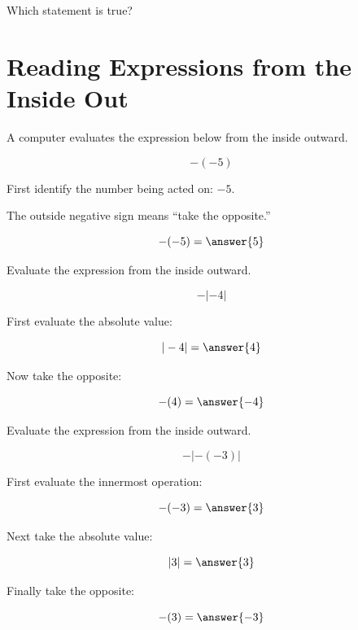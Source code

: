 \documentclass{ximera}[font=12pt]
\begin{document}
\begin{problem}
Which statement is true?

\begin{multipleChoice}
\end{multipleChoice}

\end{problem}


\section*{Reading Expressions from the Inside Out}

\begin{problem}
A computer evaluates the expression below from the inside outward.

\[
-(-5)
\]

First identify the number being acted on: $-5$.

The outside negative sign means ``take the opposite.''

\[
-(-5)=\answer{5}
\]

\end{problem}


\begin{problem}
Evaluate the expression from the inside outward.

\[
-|-4|
\]

First evaluate the absolute value:

\[
|-4|=\answer{4}
\]

Now take the opposite:

\[
-(4)=\answer{-4}
\]

\end{problem}


\begin{problem}
Evaluate the expression from the inside outward.

\[
-|-(-3)|
\]

First evaluate the innermost operation:

\[
-(-3)=\answer{3}
\]

Next take the absolute value:

\[
|3|=\answer{3}
\]

Finally take the opposite:

\[
-(3)=\answer{-3}
\]

\end{problem}
\end{document}

